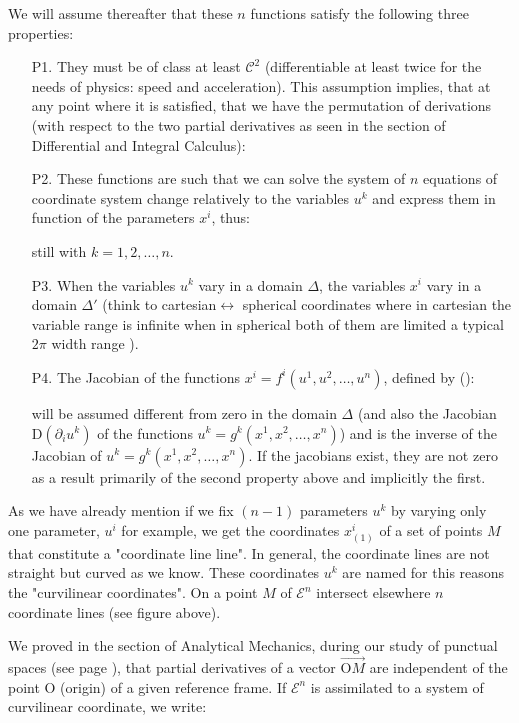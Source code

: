 	We will assume thereafter that these $n$ functions satisfy the following three properties:
	\begin{itemize}
		\item[P1.] They must be of class at least $\mathcal{C}^2$ (differentiable at least twice for the needs of physics: speed and acceleration). This assumption implies, that at any point where it is satisfied, that we have the permutation of derivations (with respect to the two partial derivatives as seen in the section of Differential and Integral Calculus):
		

		\item[P2.] These functions are such that we can solve the system of $n$ equations of coordinate system change relatively to the variables $u^k$ and express them in function of the parameters $x^i$, thus:
		
		still with $k=1,2, \ldots,n$.

		\item[P3.] When the variables $u^k$ vary in a domain $\Delta$, the variables $x^i$ vary in a domain $\Delta'$ (think to cartesian$\leftrightarrow$ spherical coordinates where in cartesian the variable range is infinite when in spherical both of them are limited a typical $2\pi$ width range ). 

		\item[P4.] The Jacobian of the functions $x^i=f^i(u^1,u^2,\ldots,u^n)$, defined by ():
		
		will be assumed different from zero in the domain $\Delta$ (and also the Jacobian $\mathrm{D}(\partial_i u^k)$ of the functions $u^k=g^k(x^1,x^2,\ldots,x^n)$) and is the inverse of the Jacobian of $u^k=g^k(x^1,x^2,\ldots,x^n)$. If the jacobians exist, they are not zero as a result primarily of the second property above and implicitly the first.
	\end{itemize}
	As we have already mention if we fix $(n-1)$ parameters $u^k$ by varying only one parameter, $u^i$ for example, we get the coordinates $x_{(1)}^i$ of a set of points $M$ that constitute a "coordinate line line". In general, the coordinate lines are not straight but curved as we know. These coordinates $u^k$ are named for this reasons the "curvilinear coordinates". On a point $M$ of $\mathcal{E}^n$ intersect elsewhere $n$ coordinate lines (see figure above).
	
	We proved in the section of Analytical Mechanics, during our study of punctual spaces (see page \pageref{point spaces}), that partial derivatives of a vector $\overrightarrow{\text{O}M}$ are independent of the point O (origin) of a given reference frame. If $\mathcal{E}^n$ is assimilated to a system of curvilinear coordinate, we write:
	
